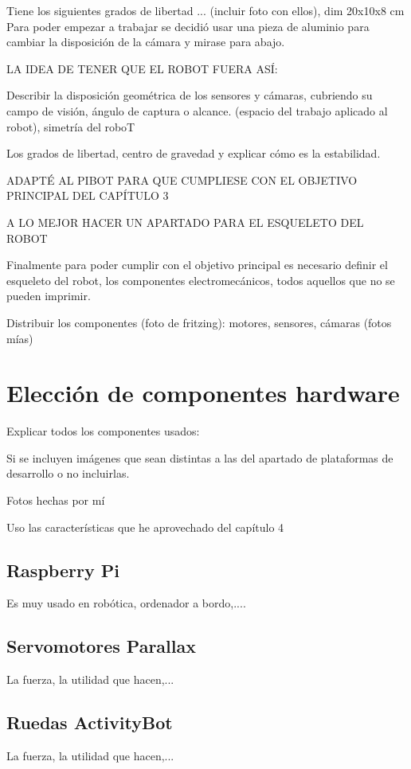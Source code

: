Tiene los siguientes grados de libertad ... (incluir foto con ellos), dim 20x10x8 cm
Para poder empezar a trabajar se decidió usar una pieza de aluminio para cambiar la disposición de la cámara y mirase para abajo.

LA IDEA DE TENER QUE EL ROBOT FUERA ASÍ: 

Describir la disposición geométrica de los sensores y cámaras, cubriendo su campo de visión, ángulo de captura o alcance. (espacio del trabajo aplicado al robot), simetría del roboT


Los grados de libertad, centro de gravedad y explicar cómo es la estabilidad.

ADAPTÉ AL PIBOT  PARA QUE CUMPLIESE CON EL OBJETIVO PRINCIPAL DEL CAPÍTULO 3 


A LO MEJOR HACER UN APARTADO PARA EL ESQUELETO DEL ROBOT 

Finalmente para poder cumplir con el objetivo principal es necesario definir el esqueleto del robot, los componentes electromecánicos, todos aquellos que no se pueden imprimir. 

Distribuir los componentes (foto de fritzing): motores, sensores, cámaras (fotos mías)



\section{Elección de componentes hardware}

Explicar todos los componentes usados: 

Si se incluyen imágenes que sean distintas a las del apartado de plataformas de desarrollo o no incluirlas. 

Fotos hechas por mí 

Uso las características que he aprovechado del capítulo 4 

\subsection{Raspberry Pi}

Es muy usado en robótica, ordenador a bordo,....

\subsection{Servomotores Parallax}
La fuerza, la utilidad que hacen,...


\subsection{Ruedas ActivityBot}
La fuerza, la utilidad que hacen,...


